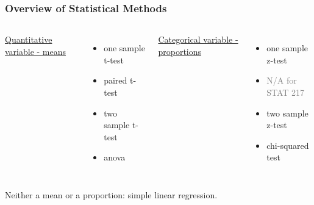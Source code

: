 \begin{frame}[label=overview]
\frametitle{Overview of Statistical Methods}
\begin{columns}
\underline{Quantitative variable - means}
\begin{itemize}
    \item
    one sample t-test
    \item
    paired t-test
    \item
    two sample t-test
    \item
    anova
\end{itemize}
\underline{Categorical variable - proportions}
\begin{itemize}
    \item
    one sample z-test
    \item
    \textcolor{gray}{N/A for STAT 217}
    \item
    two sample z-test
    \item
    chi-squared test
\end{itemize}
\end{columns}
\vskip20pt
Neither a mean or a proportion: simple linear regression.
\begin{flushright}
\hyperlink{topics}{}
\end{flushright}
\end{frame}


